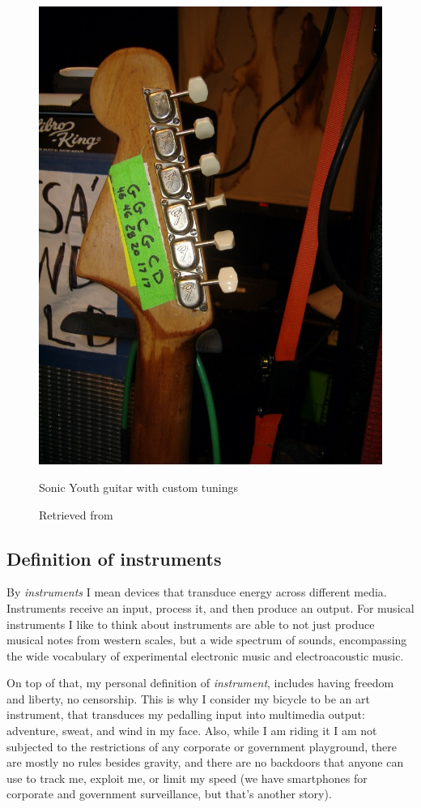 \begin{figure}[ht]
  \centering
  \includegraphics[width=0.75\linewidth,height=0.30\textheight,keepaspectratio]{images/sonic-youth-guitar.jpg}
  \caption{Sonic Youth guitar with custom tunings}
  \caption*{Retrieved from \cite{sonic-youth-illustrated-equipment-guide}}
  \label{fig:sonic-youth-guitar}
\end{figure}

\subsection{Definition of instruments}

By \emph{instruments} I mean devices that transduce energy across different media. Instruments receive an input, process it, and then produce an output. For musical instruments I like to think about instruments are able to not just produce musical notes from western scales, but a wide spectrum of sounds, encompassing the wide vocabulary of experimental electronic music and electroacoustic music.

On top of that, my personal definition of \emph{instrument}, includes having freedom and liberty, no censorship. This is why I consider my bicycle to be an art instrument, that transduces my pedalling input into multimedia output: adventure, sweat, and wind in my face. Also, while I am riding it I am not subjected to the restrictions of any corporate or government playground, there are mostly no rules besides gravity, and there are no backdoors that anyone can use to track me, exploit me, or limit my speed (we have smartphones for corporate and government surveillance, but that's another story).

